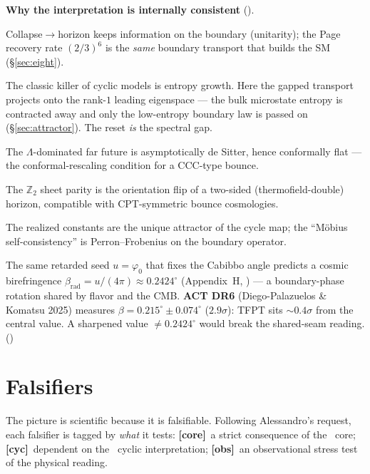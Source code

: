 \documentclass[11pt,a4paper]{article}
\newcommand{\fcore}{{\small\textcolor{tfgreen!50!black}{\textbf{[core]}}}}
\newcommand{\fcyc}{{\small\textcolor{tfgold!75!black}{\textbf{[cyc]}}}}
\newcommand{\fobs}{{\small\textcolor{tfblue!70!black}{\textbf{[obs]}}}}
\newcommand{\phiz}{\varphi_0}
\newcommand{\Z}{\mathbb Z}
\begin{document}
\par\smallskip\noindent\textbf{Why the interpretation is internally consistent} (\mC).
\begin{description}[leftmargin=2.0em,style=nextline]
\item[\textnormal{Information.}] Collapse$\to$horizon keeps information on the boundary (unitarity); the
Page recovery rate $(2/3)^6$ is the \emph{same} boundary transport that builds the SM (\S\ref{sec:eight}).
\item[\textnormal{Entropy reset (Tolman).}] The classic killer of cyclic models is entropy growth. Here the
gapped transport projects onto the rank-$1$ leading eigenspace --- the bulk microstate entropy is
contracted away and only the low-entropy boundary law is passed on (\S\ref{sec:attractor}). The reset
\emph{is} the spectral gap.
\item[\textnormal{Penrose CCC.}] The $\Lambda$-dominated far future is asymptotically de Sitter, hence
conformally flat --- the conformal-rescaling condition for a CCC-type bounce.
\item[\textnormal{CPT / Möbius.}] The $\Z_2$ sheet parity is the orientation flip of a two-sided
(thermofield-double) horizon, compatible with CPT-symmetric bounce cosmologies.
\item[\textnormal{Selection.}] The realized constants are the unique attractor of the cycle map; the
``Möbius self-consistency'' is Perron--Frobenius on the boundary operator.
\item[\textnormal{A live fossil.}] The same retarded seed $u=\phiz$ that fixes the Cabibbo angle predicts a
cosmic birefringence $\beta_{\mathrm{rad}}=u/(4\pi)\approx0.2424^\circ$ (Appendix~H, \mE) --- a
boundary-phase rotation shared by flavor and the CMB. \textbf{ACT DR6} (Diego-Palazuelos \& Komatsu 2025)
measures $\beta=0.215^\circ\pm0.074^\circ$ ($2.9\sigma$): TFPT sits $\sim0.4\sigma$ from the central value.
A sharpened value $\neq0.2424^\circ$ would break the shared-seam reading. ()
\end{description}

\section{Falsifiers}\label{sec:falsify}
The picture is scientific because it is falsifiable. Following Alessandro's request, each falsifier is
tagged by \emph{what} it tests: \fcore\ a strict consequence of the \mE\ core; \fcyc\ dependent on the
\mC\ cyclic interpretation; \fobs\ an observational stress test of the physical reading.
\end{document}
